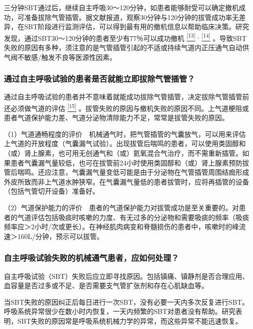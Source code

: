 三分钟SBT通过后，继续自主呼吸30～120分钟，如患者能够耐受可以确定撤机成功，可准备拔除气管插管。据文献报道，观察30分钟与120分钟的拔管成功率无差异，在SBT阶段进行监测评估，可以得到最有用的撤机信息以帮助临床决策。研究发现，通过SBT30～120分钟的患者至少有77％可以成功撤机
\protect\hyperlink{text00016.htmlux5cux23ch13-15}{\textsuperscript{{[}13{]}}}
\textsuperscript{,}
\protect\hyperlink{text00016.htmlux5cux23ch14-15}{\textsuperscript{{[}14{]}}}
。导致SBT失败的原因有多种，须注意的是气管插管引起的不适或持续气道内正压通气自动供气阀不敏感/触发不良等医源性因素。

\subsubsection{通过自主呼吸试验的患者是否就能立即拔除气管插管？}

通过自主呼吸试验的患者并不意味着就能成功拔除气管插管，决定拔除气管插管前还必须做气道的评估
\protect\hyperlink{text00016.htmlux5cux23ch15-15}{\textsuperscript{{[}15{]}}}
。拔管失败的原因与撤机失败的原因不同。上气道梗阻或患者气道保护能力差、气道分泌物清除能力不足，常常是拔管失败的原因。

（1）气道通畅程度的评价　机械通气时，把气管插管的气囊放气，可以用来评估上气道的开放程度（气囊漏气试验）。出现拔管后喘鸣的患者，可以使用类固醇和（或）肾上腺素，也可用无创通气和（或）氦氧混合气治疗，而不需重新插管。如果患者气囊漏气量较低，也可在拔管前24小时使用类固醇和（或）肾上腺素预防拔管后喘鸣。还应注意，气囊漏气量变低可能是由于分泌物在气管插管周围结痂形成外皮所致而非上气道水肿狭窄。在气囊漏气量低的患者拔管时，应将再插管的设备（包括气管切开设备）准备好。

（2）气道保护能力的评价　患者的气道保护能力对拔管成功是至关重要的。对患者的气道评估包括吸痰时咳嗽的力度、有无过多的分泌物和需要吸痰的频率（吸痰频率应＞2小时/次或更长）。在神经肌肉病变和脊髓损伤的患者中，咳嗽时的峰流速＞160L/分钟，预示可以拔管。

\subsubsection{自主呼吸试验失败的机械通气患者，应如何处理？}

自主呼吸试验（SBT）失败后应立即寻找原因。包括镇痛、镇静剂是否合理应用、血容量是否过多或不足、是否需要支气管扩张剂和存在心肌缺血等。

当SBT失败的原因纠正后每日进行一次SBT，没有必要一天内多次反复进行SBT。呼吸系统异常很少在数小时内恢复，一天内频繁的SBT对患者没有帮助。研究表明，SBT失败的原因常是呼吸系统机械力学的异常，而这些异常不能迅速恢复。

